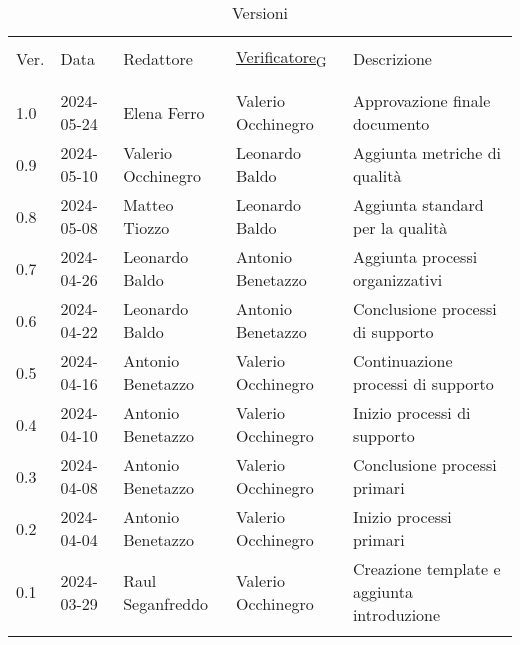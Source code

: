 \documentclass[italian,12pt]{article} %
\begin{document}


\newpage



\begin{table}[!h]
	\caption*{Versioni}
	\footnotesize
	\begin{center}
		\begin{tabular}{ l l l l p{6cm} }
			\hline                                                                                                   \\[-2ex]
			Ver. & Data       & Redattore          & \href{https://7last.github.io/docs/rtb/documentazione-interna/glossario\#verificatore}{Verificatore\textsubscript{G}}       & Descrizione                                \\
			\\[-2ex] \hline \\[-1.5ex]
			1.0  & 2024-05-24 & Elena Ferro        & Valerio Occhinegro & Approvazione finale documento              \\
			0.9  & 2024-05-10 & Valerio Occhinegro & Leonardo Baldo     & Aggiunta metriche di qualità               \\
			0.8  & 2024-05-08 & Matteo Tiozzo      & Leonardo Baldo     & Aggiunta standard per la qualità           \\
			0.7  & 2024-04-26 & Leonardo Baldo     & Antonio Benetazzo  & Aggiunta processi organizzativi            \\
			0.6  & 2024-04-22 & Leonardo Baldo     & Antonio Benetazzo  & Conclusione processi di supporto           \\
			0.5  & 2024-04-16 & Antonio Benetazzo  & Valerio Occhinegro & Continuazione processi di supporto         \\
			0.4  & 2024-04-10 & Antonio Benetazzo  & Valerio Occhinegro & Inizio processi di supporto                \\
			0.3  & 2024-04-08 & Antonio Benetazzo  & Valerio Occhinegro & Conclusione processi primari               \\
			0.2  & 2024-04-04 & Antonio Benetazzo  & Valerio Occhinegro & Inizio processi primari                    \\
			0.1  & 2024-03-29 & Raul Seganfreddo   & Valerio Occhinegro & Creazione template e aggiunta introduzione \\
			\\[-1.5ex] \hline
		\end{tabular}
	\end{center}
\end{table}
\end{document}

